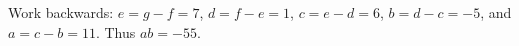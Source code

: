 Work backwards: $e=g-f=7$, $d=f-e=1$, $c=e-d=6$, $b=d-c=-5$, and $a=c-b=11$. Thus $\boxed{ab=-55}$.
